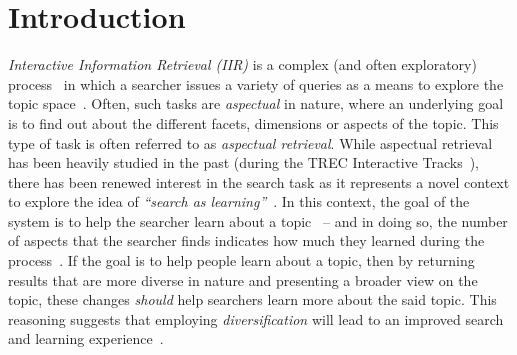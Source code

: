 \section{Introduction} \label{sec:intro}
\emph{Interactive Information Retrieval (IIR)} is a complex (and often exploratory) process~\cite{ingwersen2005theturn} in which a searcher issues a variety of queries as a means to explore the topic space~\cite{kelly2015search_tasks}. Often, such tasks are \emph{aspectual} in nature, where an underlying goal is to find out about the different facets, dimensions or aspects of the topic. This type of task is often referred to as \emph{aspectual retrieval}. While aspectual retrieval has been heavily studied in the past (during the TREC Interactive Tracks~\cite{over2001trec}), there has been renewed interest in the search task as it represents a novel context to explore the idea of \emph{``search as learning''}~\cite{collins2017sal}. In this context, the goal of the system is to help the searcher learn about a topic~\cite{collins2017sal} -- and in doing so, the number of aspects that the searcher finds indicates how much they learned during the process~\cite{syed2017sal}. If the goal is to help people learn about a topic, then by returning results that are more diverse in nature and presenting a broader view on the topic, these changes \emph{should} help searchers learn more about the said topic. This reasoning suggests that employing \emph{diversification} will lead to an improved search and learning experience~\cite{syed2017sal}. 

